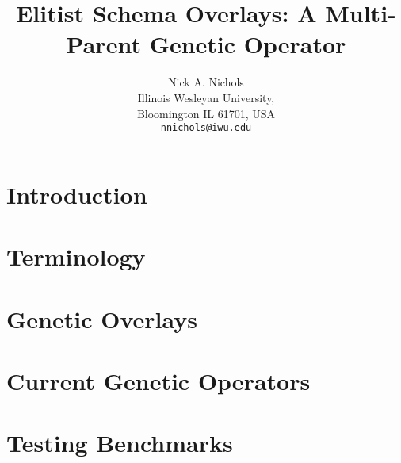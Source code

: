 \documentclass{article}
\makeatletter
\def \papertitle {Elitist Schema Overlays: A Multi-Parent Genetic Operator}
\def \paperauthors {Nick A. Nichols}
\def \paperinstitute {\small Illinois Wesleyan University, \\ \small Bloomington IL 61701, USA}
\def \paperemails {\small\href{mailto:nnichols@iwu.edu}{\nolinkurl{nnichols@iwu.edu}}}
\makeatother
\begin{document}
\title{\papertitle}
\author{\paperauthors \\ \paperinstitute \\ \paperemails}

\maketitle


\begin{abstract}

\end{abstract}








\section{Introduction} 
\label{sec:introduction}



\section{Terminology} 
\label{sec:terminology}



\section{Genetic Overlays}
\label{sec:overlays}



\section{Current Genetic Operators}
\label{sec:current}



\section{Testing Benchmarks}
\label{sec:testfunctions}

\end{document}

